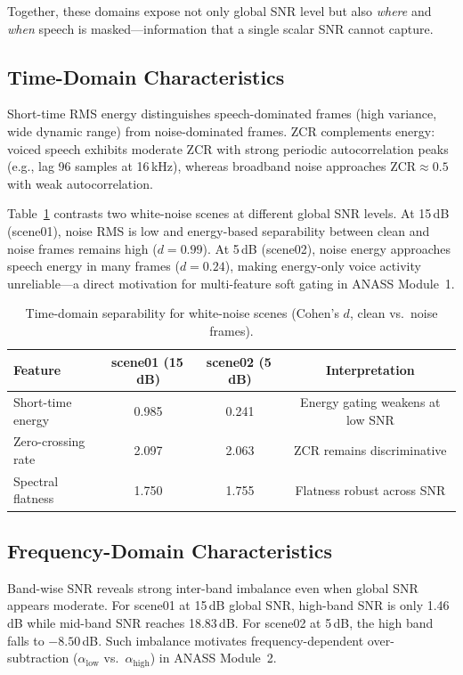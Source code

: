Together, these domains expose not only global SNR level but also \emph{where} and \emph{when} speech is masked---information that a single scalar SNR cannot capture.

\subsection{Time-Domain Characteristics}

Short-time RMS energy distinguishes speech-dominated frames (high variance, wide dynamic range) from noise-dominated frames. ZCR complements energy: voiced speech exhibits moderate ZCR with strong periodic autocorrelation peaks (e.g., lag 96 samples at 16\,kHz), whereas broadband noise approaches ZCR${}\approx 0.5$ with weak autocorrelation.

Table~\ref{tab:time_domain_compare} contrasts two white-noise scenes at different global SNR levels. At 15\,dB (scene01), noise RMS is low and energy-based separability between clean and noise frames remains high ($d=0.99$). At 5\,dB (scene02), noise energy approaches speech energy in many frames ($d=0.24$), making energy-only voice activity unreliable---a direct motivation for multi-feature soft gating in ANASS Module~1.

\begin{table}[H]
  \centering
  \caption{Time-domain separability for white-noise scenes (Cohen's $d$, clean vs.\ noise frames).}
  \label{tab:time_domain_compare}
  \begin{tabular}{lccc}
    \toprule
    \textbf{Feature} & \textbf{scene01 (15\,dB)} & \textbf{scene02 (5\,dB)} & \textbf{Interpretation} \\
    \midrule
    Short-time energy & 0.985 & 0.241 & Energy gating weakens at low SNR \\
    Zero-crossing rate  & 2.097 & 2.063 & ZCR remains discriminative \\
    Spectral flatness   & 1.750 & 1.755 & Flatness robust across SNR \\
    \bottomrule
  \end{tabular}
\end{table}

\subsection{Frequency-Domain Characteristics}

Band-wise SNR reveals strong inter-band imbalance even when global SNR appears moderate. For scene01 at 15\,dB global SNR, high-band SNR is only 1.46\,dB while mid-band SNR reaches 18.83\,dB. For scene02 at 5\,dB, the high band falls to $-8.50$\,dB. Such imbalance motivates frequency-dependent over-subtraction ($\alpha_{\mathrm{low}}$ vs.\ $\alpha_{\mathrm{high}}$) in ANASS Module~2.

